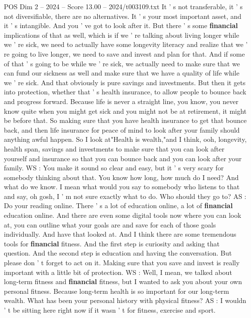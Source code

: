 \begin{textsample}{POS Dim 2 – 2024 – Score 13.00 – 2024/t003109.txt}
It ' s not transferable, it ' s not diversifiable, there are no alternatives.
It ' s your most important asset, and it ' s intangible.
And you ' ve got to look after it.
But there ' s some \textbf{financial} implications of that as well, which is if we ' re talking about living longer while we ' re sick, we need to actually have some longevity literacy and realize that we ' re going to live longer, we need to save and invest and plan for that.
And if some of that ' s going to be while we ' re sick, we actually need to make sure that we can fund our sickness as well and make sure that we have a quality of life while we ' re sick.
And that obviously is pure savings and investments.
But then it gets into protection, whether that ' s health insurance, to allow people to bounce back and progress forward.
Because life is never a straight line, you know, you never know quite when you might get sick and you might not be at retirement, it might be before that.
So making sure that you have health insurance to get that bounce back, and then life insurance for peace of mind to look after your family should anything awful happen.
So I look at"Health is wealth,"and I think, ooh, longevity, health span, savings and investments to make sure that you can look after yourself and insurance so that you can bounce back and you can look after your family.
WS : You make it sound so clear and easy, but it ' s very scary for somebody thinking about that.
You know how long, how much do I need?
And what do we know.
I mean what would you say to somebody who listens to that and say, oh gosh, I ' m not sure exactly what to do.
Who should they go to?
AS : Do your reading online.
There ' s a lot of education online, a lot of \textbf{financial} education online.
And there are even some digital tools now where you can look at, you can outline what your goals are and save for each of those goals individually.
And have that looked at.
And I think there are some tremendous tools for \textbf{financial} fitness.
And the first step is curiosity and asking that question.
And the second step is education and having the conversation.
But please don ' t forget to act on it.
Making sure that you save and invest is really important with a little bit of protection.
WS : Well, I mean, we talked about long-term fitness and \textbf{financial} fitness, but I wanted to ask you about your own personal fitness.
Because long-term health is so important for our long-term wealth.
What has been your personal history with physical fitness?
AS : I wouldn ' t be sitting here right now if it wasn ' t for fitness, exercise and sport.

\end{textsample}
